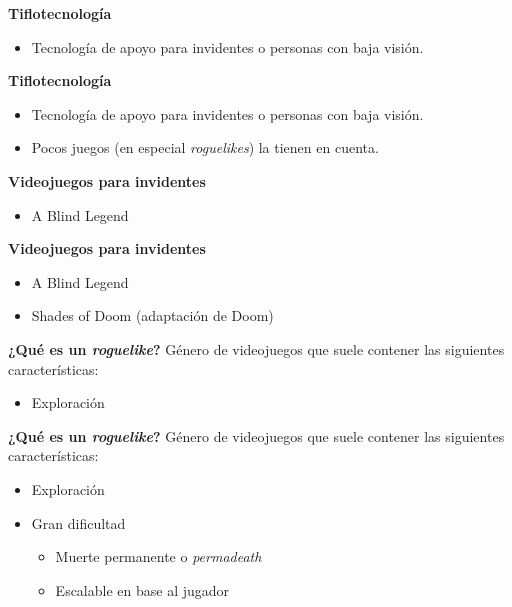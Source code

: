 \begin{tframe}{\textbf{Tiflotecnología}}
	\begin{itemize}
			\item<+-| alert@+> Tecnología de apoyo para invidentes o personas con baja visión.
	\end{itemize}
\end{tframe}

\begin{tframe}{\textbf{Tiflotecnología}}
	\begin{itemize}
			\item Tecnología de apoyo para invidentes o personas con baja visión.
			\item<+-| alert@+> Pocos juegos (en especial \textit{roguelikes}) la tienen en cuenta.
	\end{itemize}
\end{tframe}

\begin{tframe}{\textbf{Videojuegos para invidentes}}
	\begin{itemize}
			\item<+-| alert@+> A Blind Legend
	\end{itemize}
\end{tframe}

\begin{tframe}{\textbf{Videojuegos para invidentes}}
	\begin{itemize}
			\item A Blind Legend
			\item<+-| alert@+> Shades of Doom (adaptación de Doom)
	\end{itemize}
\end{tframe}

\begin{tframe}{\textbf{¿Qué es un \textit{roguelike}?}}
	Género de videojuegos que suele contener las siguientes características:
	\begin{itemize}
		\item<+-| alert@+> Exploración
	\end{itemize}
\end{tframe}

\begin{tframe}{\textbf{¿Qué es un \textit{roguelike}?}}
	Género de videojuegos que suele contener las siguientes características:
	\begin{itemize}
		\item Exploración
		\item<+-| alert@+> Gran dificultad
			\begin{itemize}
				\item Muerte permanente o \textit{permadeath}
				\item Escalable en base al jugador
			\end{itemize}
	\end{itemize}
\end{tframe}

